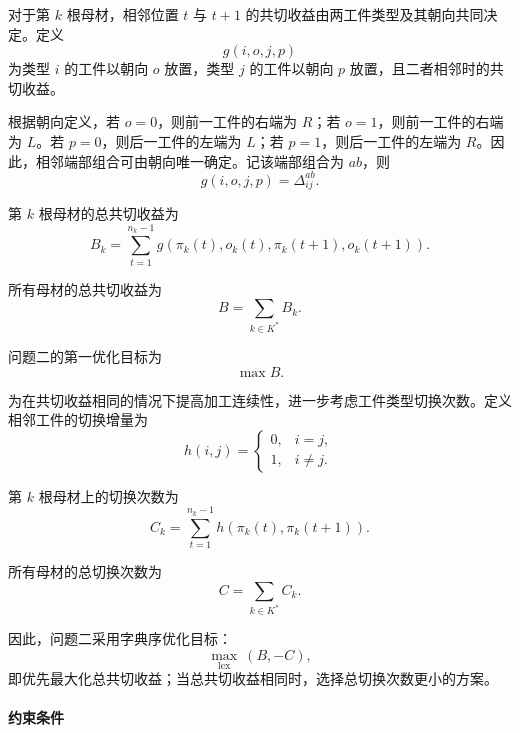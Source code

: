 \documentclass[UTF8]{ctexart}
\begin{document}
对于第 $k$ 根母材，相邻位置 $t$ 与 $t+1$ 的共切收益由两工件类型及其朝向共同决定。定义
\[
g(i,o,j,p)
\]
为类型 $i$ 的工件以朝向 $o$ 放置，类型 $j$ 的工件以朝向 $p$ 放置，且二者相邻时的共切收益。

根据朝向定义，若 $o=0$，则前一工件的右端为 $R$；若 $o=1$，则前一工件的右端为 $L$。若 $p=0$，则后一工件的左端为 $L$；若 $p=1$，则后一工件的左端为 $R$。因此，相邻端部组合可由朝向唯一确定。记该端部组合为 $ab$，则
\begin{equation}
g(i,o,j,p)=\Delta_{ij}^{ab}.
\label{eq:p2_g}
\end{equation}

第 $k$ 根母材的总共切收益为
\begin{equation}
B_k=
\sum_{t=1}^{n_k-1}
g\left(\pi_k(t),o_k(t),\pi_k(t+1),o_k(t+1)\right).
\label{eq:p2_Bk}
\end{equation}

所有母材的总共切收益为
\begin{equation}
B=\sum_{k\in K^*}B_k.
\label{eq:p2_total_B}
\end{equation}

问题二的第一优化目标为
\begin{equation}
\max B.
\label{eq:p2_obj_B}
\end{equation}

为在共切收益相同的情况下提高加工连续性，进一步考虑工件类型切换次数。定义相邻工件的切换增量为
\begin{equation}
h(i,j)=
\begin{cases}
0, & i=j,\\
1, & i\neq j.
\end{cases}
\label{eq:p2_h}
\end{equation}

第 $k$ 根母材上的切换次数为
\begin{equation}
C_k=
\sum_{t=1}^{n_k-1}
h\left(\pi_k(t),\pi_k(t+1)\right).
\label{eq:p2_Ck}
\end{equation}

所有母材的总切换次数为
\begin{equation}
C=\sum_{k\in K^*}C_k.
\label{eq:p2_total_C}
\end{equation}

因此，问题二采用字典序优化目标：
\begin{equation}
\max_{\mathrm{lex}}\ (B,-C),
\label{eq:p2_lex_obj}
\end{equation}
即优先最大化总共切收益；当总共切收益相同时，选择总切换次数更小的方案。

\paragraph{约束条件}
\end{document}

